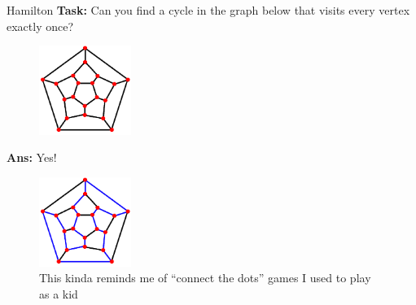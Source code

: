 \documentclass{beamer}
\begin{document}
\begin{frame}{Hamilton}
\textbf{Task:} Can you find a cycle in the graph below that visits every vertex exactly once?

\begin{figure}[h]
    \centering
    \includegraphics[width=3cm]{img/projected_dodecahedron.png}
\end{figure}

\pause

\textbf{Ans:} Yes!

\begin{figure}[h]
    \centering
    \includegraphics[width=3cm]{img/projected_dodecahedron_path.png}
    \caption*{\small{This kinda reminds me of ``connect the dots'' games I used to play as a kid}}
\end{figure}

\end{frame}
\end{document}
